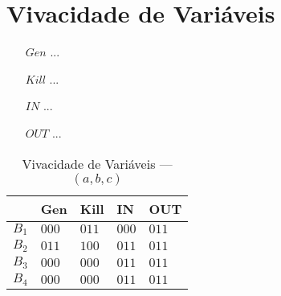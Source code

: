\section{Vivacidade de Vari\'aveis}

\begin{itemize}
  \item[$Gen$] ...
  \item[$Kill$] ...
  \item[$IN$] ...
  \item[$OUT$] ...
\end{itemize}



\begin{table}[ht]
\centering
\begin{tabular}{l|l|l|l|l}
	& Gen & Kill & IN & OUT\\
\hline
$B_{1}$ &  $000$ & $011$ & $000$ & $011$\\
$B_{2}$ &  $011$ & $100$ & $011$ & $011$\\
$B_{3}$ &  $000$ & $000$ & $011$ & $011$\\
$B_{4}$ &  $000$ & $000$ & $011$ & $011$\\
\end{tabular}
\caption{Vivacidade de Vari\'aveis --- $(a, b, c)$}
\end{table}

